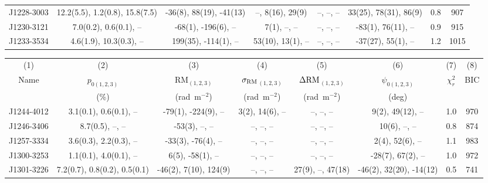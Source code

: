 \documentclass{mnras}
\newcommand*\sigmaRM{\sigma_{\rm RM}}
\newcommand*\DeltaRM{\Delta{\rm RM}}
\begin{document}
\begin{table*}
\begin{tabular}{cccccccc}
J1228-3003 & 12.2(5.5), 1.2(0.8), 15.8(7.5) & -36(8), 88(19), -41(13) & --, 8(16), 29(9) & --, --, -- & 33(25), 78(31), 86(9) & 0.8 & 907 \\ 

J1230-3121 & 7.0(0.2), 0.6(0.1), -- & -68(1), -196(6), -- & 7(1), --, -- & --, --, -- & -83(1), 76(11), -- & 0.9 & 915 \\ 

J1233-3534 & 4.6(1.9), 10.3(0.3), -- & 199(35), -114(1), -- & 53(10), 13(1), -- & --, --, -- & -37(27), 55(1), -- & 1.2 & 1015 \\ 
      \hline
   \end{tabular}%
\label{modelfits}
\end{table*}


\begin{table*}%
 \contcaption{ }
 \scriptsize
 \centering
   \begin{tabular}{cccccccc}
    \hline\hline
       (1) & (2) & (3) & (4) & (5) & (6) & (7) & (8)  \\
      Name  & $p_{0(1,2,3)}$ & RM$_{(1,2,3)}$ & $\sigmaRM$$_{(1,2,3)}$ & $\DeltaRM$$_{(1,2,3)}$ & $\psi_{0(1,2,3)}$ & $\chi^2_{r}$ & BIC \\
                 &  (\%)               & (rad~m$^{-2}$) & (rad~m$^{-2}$)                 & (rad~m$^{-2}$)                &    (deg)               &                          &        \\
      \hline 
J1244-4012 & 3.1(0.1), 0.6(0.1), -- & -79(1), -224(9), -- & 3(2), 14(6), -- & --, --, -- & 9(2), 49(12), -- & 1.0 & 970 \\ 

J1246-3406 & 8.7(0.5), --, -- & -53(3), --, -- & --, --, -- & --, --, -- & 10(6), --, -- & 0.8 & 874 \\ 

J1257-3334 & 3.6(0.3), 2.2(0.3), -- & -33(3), -76(4), -- & --, --, -- & --, --, -- & 2(4), 52(6), -- & 1.1 & 983 \\ 

J1300-3253 & 1.1(0.1), 4.0(0.1), -- & 6(5), -58(1), -- & --, --, -- & --, --, -- & -28(7), 67(2), -- & 1.0 & 972 \\ 

J1301-3226 & 7.2(0.7), 0.8(0.2), 0.5(0.1) & -46(2), 7(10), 124(9) & --, --, -- & 27(9), --, 47(18) & -46(2), 32(20), -14(12) & 0.5 & 741 \\ 


\end{tabular}
\end{table*}
\end{document}
